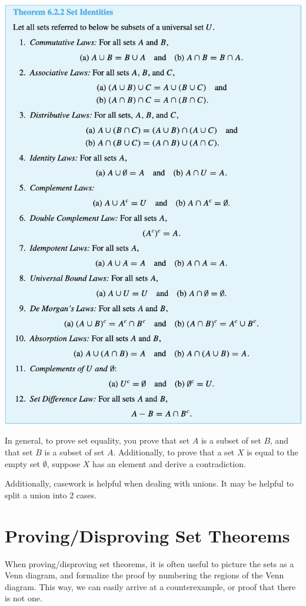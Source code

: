 \documentclass[a4paper]{report}
\begin{document}
\includegraphics[scale=0.65]{setids}

In general, to prove set equality, you prove that set $A$ is a subset of set $B$, and that
set $B$ is a subset of set $A$. Additionally, to prove that a set $X$ is equal to the empty set
$\emptyset$, suppose $X$ has an element and derive a contradiction.

Additionally, casework is helpful when dealing with unions. It may be helpful to split a union into
2 cases.

\section{Proving/Disproving Set Theorems}

When proving/disproving set theorems, it is often useful to picture the sets as a Venn diagram, and
formalize the proof by numbering the regions of the Venn diagram. This way, we can easily arrive
at a counterexample, or proof that there is not one.
\end{document}
